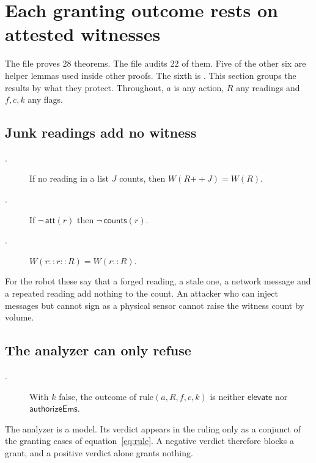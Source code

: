 \section{Each granting outcome rests on attested witnesses}\label{sec:lean-theorems}

The file proves 28 theorems.
The file  audits 22 of them.
Five of the other six are helper lemmas used inside other proofs.
The sixth is .
This section groups the results by what they protect.
Throughout, $a$ is any action, $R$ any readings and $f, c, k$ any flags.

\subsection{Junk readings add no witness}

\begin{description}
  \item[.] If no reading in a list $J$ counts, then
  $W(R \mathbin{+\!\!+} J) = W(R)$.
  \item[.] If $\neg\,\mathsf{att}(r)$ then
  $\neg\,\mathsf{counts}(r)$.
  \item[.] $W(r :: r :: R) = W(r :: R)$.
\end{description}
For the robot these say that a forged reading, a stale one, a network message and a repeated
reading add nothing to the count.
An attacker who can inject messages but cannot sign as a physical sensor cannot raise the
witness count by volume.

\subsection{The analyzer can only refuse}

\begin{description}
  \item[.] With $k$ false, the outcome of
  $\mathrm{rule}(a, R, f, c, k)$ is neither $\mathsf{elevate}$ nor $\mathsf{authorizeEms}$.
\end{description}
The analyzer is a model.
Its verdict appears in the ruling only as a conjunct of the granting cases of
equation~\eqref{eq:rule}.
A negative verdict therefore blocks a grant, and a positive verdict alone grants nothing.

